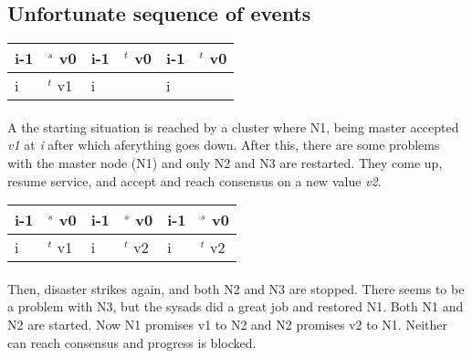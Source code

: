 \subsection{Unfortunate sequence of events}
\begin{supertabular}{|l|l|l|l|l|l|}
  i-1 & $^s$  v0 & i-1 & $^t$ v0 & i-1 & $^t$ v0\\\hline
  i   & $^t$  v1 &   i &         &   i &        \\
\hline
\end{supertabular}
\paragraph{}
A the starting situation is reached by a cluster where N1, being master accepted \emph{v1} at \emph{i} after which aferything goes down.
After this, there are some problems with the master node (N1) and only N2 and N3 are restarted.
They come up, resume service, and accept and reach consensus on a new value \emph{v2}.
\\
\begin{supertabular}{|l|l|l|l|l|l|}
  i-1 & $^s$  v0 & i-1 & $^s$ v0 & i-1 & $^s$ v0\\\hline
  i   & $^t$  v1 &   i & $^t$ v2 &   i & $^t$ v2\\
\hline
\end{supertabular}
\paragraph{}
Then, disaster strikes again, and both N2 and N3 are stopped. 
There seems to be a problem with N3, but the sysads did a great job and restored N1.
Both N1 and N2 are started. 
Now N1 promises v1 to N2 and N2 promises v2 to N1. 
Neither can reach consensus and progress is blocked.



